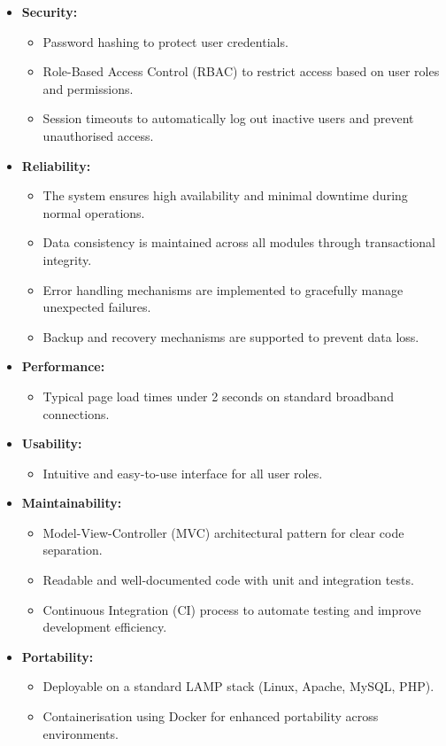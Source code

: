 \documentclass[12pt, a4paper]{report}
\begin{document}
\begin{itemize}
    \item \textbf{Security:}
    \begin{itemize}
        \item Password hashing to protect user credentials.
        \item Role-Based Access Control (RBAC) to restrict access based on user roles and permissions.
        \item Session timeouts to automatically log out inactive users and prevent unauthorised access.
    \end{itemize}

    \item \textbf{Reliability:}
    \begin{itemize}
        \item The system ensures high availability and minimal downtime during normal operations.
        \item Data consistency is maintained across all modules through transactional integrity.
        \item Error handling mechanisms are implemented to gracefully manage unexpected failures.
        \item Backup and recovery mechanisms are supported to prevent data loss.
    \end{itemize}

    \item \textbf{Performance:}
    \begin{itemize}
        \item Typical page load times under 2 seconds on standard broadband connections.
    \end{itemize}

    \item \textbf{Usability:}
    \begin{itemize}
        \item Intuitive and easy-to-use interface for all user roles.
    \end{itemize}

    \item \textbf{Maintainability:}
    \begin{itemize}
        \item Model-View-Controller (MVC) architectural pattern for clear code separation.
        \item Readable and well-documented code with unit and integration tests.
        \item Continuous Integration (CI) process to automate testing and improve development efficiency.
    \end{itemize}

    \item \textbf{Portability:}
    \begin{itemize}
        \item Deployable on a standard LAMP stack (Linux, Apache, MySQL, PHP).
        \item Containerisation using Docker for enhanced portability across environments.
    \end{itemize}
\end{itemize}
\end{document}
